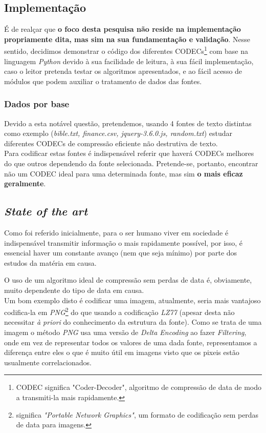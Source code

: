 \documentclass[12pt,journal,compsoc]{IEEEtran}
\begin{document}
\subsection{Implementação}


É de realçar que \textbf{o foco desta pesquisa não reside na implementação propriamente dita, mas sim na sua fundamentação e validação}. Nesse sentido, decidimos demonstrar o código dos diferentes CODECs\footnote{CODEC significa "Coder-Decoder", algoritmo de compressão de data de modo a transmiti-la mais rapidamente.} com base na linguagem \textit{Python} devido à sua facilidade de leitura, à sua fácil implementação, caso o leitor pretenda testar os algoritmos apresentados, e ao fácil acesso de módulos que podem auxiliar o tratamento de dados das fontes.

\IEEEpubidadjcol

\subsubsection{Dados por base}
Devido a esta notável questão, pretendemos, usando 4 fontes de texto distintas como exemplo (\textit{bible.txt, finance.csv, jquery-3.6.0.js, random.txt}) estudar diferentes CODECs de compressão eficiente não destrutiva de texto.\\
Para codificar estas fontes é indispensável referir que haverá CODECs melhores do que outros dependendo da fonte selecionada. Pretende-se, portanto, encontrar não um CODEC ideal para uma determinada fonte, mas sim \textbf{o mais eficaz geralmente}. 

\subsection{\textit{State of the art}}
Como foi referido inicialmente, para o ser humano viver em sociedade é indispensável transmitir informação o mais rapidamente possível, por isso, é essencial haver um constante avanço (nem que seja mínimo) por parte dos estudos da matéria em causa.

O uso de um algoritmo ideal de compressão sem perdas de data é, obviamente, muito dependente do tipo de data em causa.\\Um bom exemplo disto é codificar uma imagem, atualmente, seria mais vantajoso codifica-la em \textit{PNG}\footnote{significa \textit{"Portable Network Graphics"}, um formato de codificação sem perdas de data para imagens.} do que usando a codificação \textit{LZ77} (apesar desta não necessitar \textit{à priori} do conhecimento da estrutura da fonte). Como se trata de uma imagem o método \textit{PNG} usa uma versão de  \textit{Delta Encoding} ao fazer \textit{Filtering}, onde em vez de representar todos os valores de uma dada fonte, representamos a diferença entre eles o que é muito útil em imagens visto que os pixeis estão usualmente correlacionados.
\end{document}
